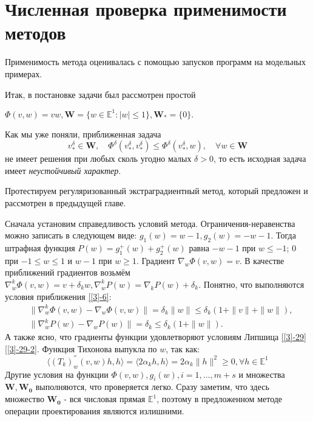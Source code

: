 \section{Численная проверка применимости методов}
Применимость метода оценивалась с помощью запусков программ на модельных примерах. 

Итак, в постановке задачи был рассмотрен простой
\begin{example}
	\label{exp-1}
	$\Phi(v,w)=vw,\mathbf{W}=\{w\in \mathbb{E}^1:|w|\leqslant 1 \},\mathbf{W_*}=\{0 \}.$
\end{example}
Как мы уже поняли, приближенная задача
\begin{equation}
v_*^{\delta}\in \mathbf{W},\quad\Phi^{\delta}(v_*^{\delta},v_*^{\delta})\leqslant \Phi^{\delta}(v_*^{\delta},w),\quad \forall w\in \mathbf{W}
\end{equation}
не имеет решения при любых сколь угодно малых $\delta >0$, то есть исходная задача имеет \textit{неустойчивый характер}.

Протестируем регуляризованный экстраградиентный метод, который предложен и рассмотрен в предыдущей главе. 

Сначала установим справедливость условий метода. Ограничения-неравенства можно записать в следующем виде: $g_1(w)=w-1,g_2(w)=-w-1$. Тогда штрафная функция $P(w)=g_1^+(w)+g_2^+(w)$ равна $-w-1$ при $w\leqslant -1$; $0$ при $-1\leqslant w\leqslant 1$ и $w-1$ при $w\geqslant 1$. Градиент $\nabla_w \Phi(v,w)=v.$ В качестве приближений градиентов возьмём $\nabla_w^k\Phi(v,w)=v+\delta_k w,\nabla_w^kP(w)=\nabla_k P(w)+\delta_k$. Понятно, что выполняются условия приближения \eqref{[3]-6}:
\begin{equation*}
\begin{aligned}
&\|\nabla_w^k\Phi(v,w)-\nabla_w\Phi(v,w)\|=\delta_k\|w\|\leqslant \delta_k(1+\|v\|+\|w\|),\\
&\|\nabla_w^kP(w)-\nabla_wP(w)\|=\delta_k\leqslant \delta_k(1+\|w\|).
\end{aligned}
\end{equation*}
А также ясно, что градиенты функции удовлетворяют условиям Липшица \eqref{[3]-29}\eqref{[3]-29-2}. Функция Тихонова выпукла по $w$, так как:
\begin{equation*}
\big\langle (T_k)_w^{''}(v,w)h,h\big\rangle = \langle 2\alpha_k h,h \rangle = 2\alpha_k\|h\|^2\geqslant 0,\forall h\in \mathbb{E}^1
\end{equation*}
Другие условия на функции $\Phi(v,w),g_i(w),i=1,...,m+s$ и множества $\mathbf{W},\mathbf{W_{0}}$ выполняются, что проверяется легко. Сразу заметим, что здесь множество $\mathbf{W_{0}}$ - вся числовая прямая $\mathbb{E}^1$, поэтому в предложенном методе операции проектирования являются излишними. 

